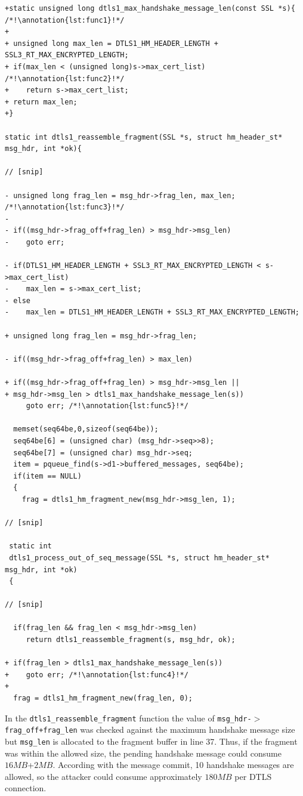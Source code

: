 \documentclass[10pt,conference]{IEEEtran}
\newcounter{lstannotation}
\renewcommand{\thelstannotation}{\ding{\number\numexpr181+\arabic{lstannotation}}}
\newcommand{\annotation}[1]{\refstepcounter{lstannotation}\label{#1}\thelstannotation}
\newcommand{\Sof}[1]{\textbf{[Sofia:[}{\color{red} #1}\textbf{]]}}
\begin{document}
\setcounter{lstannotation}{0}
\begin{lstlisting}[caption={Fix provided by OpenSSL developers to the CVE-2014-3506 vulnerability \Sof{@todo: Fix the regex issue}},label={lst:vuln}]
+static unsigned long dtls1_max_handshake_message_len(const SSL *s){ /*!\annotation{lst:func1}!*/
+
+ unsigned long max_len = DTLS1_HM_HEADER_LENGTH + SSL3_RT_MAX_ENCRYPTED_LENGTH;
+ if(max_len < (unsigned long)s->max_cert_list) /*!\annotation{lst:func2}!*/
+    return s->max_cert_list;
+ return max_len;
+}

static int dtls1_reassemble_fragment(SSL *s, struct hm_header_st* msg_hdr, int *ok){

// [snip]

- unsigned long frag_len = msg_hdr->frag_len, max_len; /*!\annotation{lst:func3}!*/
-
- if((msg_hdr->frag_off+frag_len) > msg_hdr->msg_len)
-    goto err;

- if(DTLS1_HM_HEADER_LENGTH + SSL3_RT_MAX_ENCRYPTED_LENGTH < s->max_cert_list)
-    max_len = s->max_cert_list;
- else
-    max_len = DTLS1_HM_HEADER_LENGTH + SSL3_RT_MAX_ENCRYPTED_LENGTH;

+ unsigned long frag_len = msg_hdr->frag_len;

- if((msg_hdr->frag_off+frag_len) > max_len)

+ if((msg_hdr->frag_off+frag_len) > msg_hdr->msg_len ||
+ msg_hdr->msg_len > dtls1_max_handshake_message_len(s))
     goto err; /*!\annotation{lst:func5}!*/

  memset(seq64be,0,sizeof(seq64be));
  seq64be[6] = (unsigned char) (msg_hdr->seq>>8);
  seq64be[7] = (unsigned char) msg_hdr->seq;
  item = pqueue_find(s->d1->buffered_messages, seq64be);
  if(item == NULL)
  {
    frag = dtls1_hm_fragment_new(msg_hdr->msg_len, 1);

// [snip]

 static int
 dtls1_process_out_of_seq_message(SSL *s, struct hm_header_st* msg_hdr, int *ok)
 {

// [snip]

  if(frag_len && frag_len < msg_hdr->msg_len)
     return dtls1_reassemble_fragment(s, msg_hdr, ok);

+ if(frag_len > dtls1_max_handshake_message_len(s))
+    goto err; /*!\annotation{lst:func4}!*/
+
  frag = dtls1_hm_fragment_new(frag_len, 0);

\end{lstlisting}

In the \texttt{dtls1\_reassemble\_fragment} function the value of \texttt{msg\_hdr-$>$frag\_off+frag\_len} was checked against the
maximum handshake message size but \texttt{msg\_len} is allocated to the fragment buffer in line 37. Thus, if the fragment was within
the allowed size, the pending handshake message could consume $16MB$+$2MB$. According with the message commit, 10 handshake messages
are allowed, so the attacker could consume approximately $180MB$ per DTLS connection.
\end{document}
